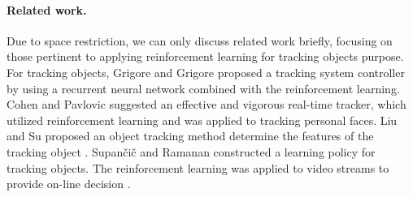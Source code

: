 \documentclass{svproc}
\begin{document}
	\paragraph{Related work.} 
	Due to space restriction, we can only discuss related work briefly, focusing on those pertinent to applying reinforcement learning for tracking objects purpose. %
	For tracking objects, Grigore and Grigore \cite{Grigore2000Reinforcement} proposed a tracking system controller by using a recurrent neural network combined  with the reinforcement learning. %
	Cohen and Pavlovic \cite{Cohen2010Reinforcement} suggested an effective and vigorous real-time tracker, which utilized reinforcement learning and was applied to tracking personal faces. Liu and Su proposed an object tracking method %
	determine the features of the tracking object \cite{Liu2004Reinforcement}. Supan\v{c}i\v{c} and Ramanan constructed a learning policy for tracking objects. The reinforcement learning was applied to video streams to provide on-line decision \cite{Supancic2017Tracking}. 
	
	
\end{document}
